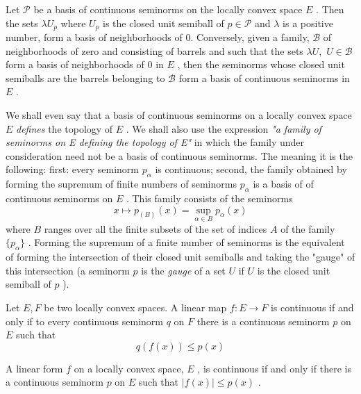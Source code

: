 \begin{prop}
	Let $ \mathcal{P} $ be a basis of continuous seminorms on the locally convex space $ E $ . Then the sets $ \lambda U_{ p } $ where $ U_{ p } $ is the closed unit semiball of $ p  \in \mathcal{P} $ and $ \lambda $ is a positive number, form a basis of neighborhoods of 0. Conversely, given a family, $ \mathcal{B} $  of neighborhoods of zero and consisting of barrels and such that the sets $ \lambda U, \hspace{4pt} U \in \mathcal{B} $ form a basis of neighborhoods of 0 in $ E $ , then the seminorms whose closed unit semiballs are the barrels belonging to $ \mathcal{B} $ form a basis of continuous seminorms in $ E $ .
\end{prop}

We shall even say that a basis of continuous seminorms on a locally convex space $ E $ \textit{defines} the topology of $ E $ . We shall also use the expression \textit{"a family of seminorms on E defining the topology of E"} in which the family under consideration need not be a basis of continuous seminorms. The meaning it is the following: first: every seminorm $ p_{ \alpha } $ is continuous; second, the family obtained by forming the supremum of finite numbers of seminorms $ p_{ \alpha } $ is a basis of of continuous seminorms on $ E $ . This family consists of the seminorms
\[
	x \mapsto p_{ (B) } (x) = \sup_{ \alpha \in B } p_{ \alpha } (x)
\]
where $ B $ ranges over all the finite subsets of the set of indices $ A $ of the family $ \{ p_{ \alpha } \} $ . Forming the supremum of a finite number of seminorms is the equivalent of forming the intersection of their closed unit semiballs and taking the "gauge" of this intersection (a seminorm $ p $ is the \textit{gauge} of a set $ U $ if $ U $ is the closed unit semiball of $ p $ ).

\begin{prop}
	Let $ E,F $ be two locally convex spaces. A linear map $ f:E \to F $ is continuous if and only if to every continuous seminorm $ q $ on $ F $ there is a continuous seminorm $ p $ on $ E $ such that
	\[
		q \left( f\left( x \right) \right) \leq p(x)
	\]
\end{prop}

\begin{cor}
	A linear form $ f $ on a locally convex space, $ E $ , is continuous if and only if there is a continuous seminorm $ p $ on $ E $ such that $ \vert f(x) \vert \leq p(x) $ .
\end{cor}

